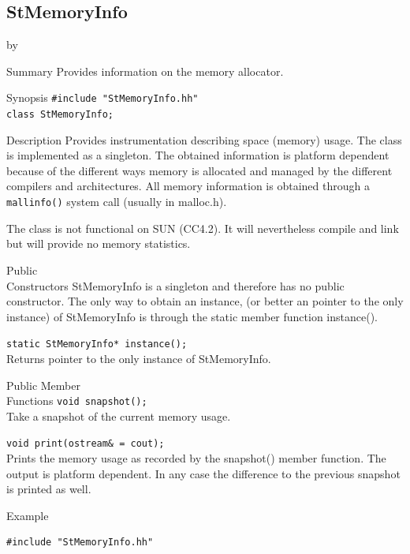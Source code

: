 \documentclass[twoside]{article}
\newcommand{\comp}[1]{\texttt{#1}}%
\newcommand{\entrylabel}[1]{\mbox{\textbf{{#1}}}\hfil}%
\newenvironment{entry}
{\begin{list}{}%
    {\renewcommand{\makelabel}{\entrylabel}%
     \setlength{\labelwidth}{90pt}%
     \setlength{\leftmargin}{\labelwidth}
     \advance\leftmargin by \labelsep%
      }%
    }%
  {\end{list}}
\newcommand{\Entrylabel}[1]%
{\raisebox{0pt}[1ex][0pt]{\makebox[\labelwidth][l]%
    {\parbox[t]{\labelwidth}{\hspace{0pt}\textbf{{#1}}}}}}
\newenvironment{Entry}%
{\renewcommand{\entrylabel}{\Entrylabel}\begin{entry}}%
  {\end{entry}}
\begin{document}
\subsection{StMemoryInfo}
\label{StMemoryInfo}
\begin{Entry}
\item[Summary]
    Provides information on the memory allocator.

\item[Synopsis]
    \verb+#include "StMemoryInfo.hh"+\\
    \verb+class StMemoryInfo;+
    
\item[Description]   
    Provides instrumentation describing space (memory) usage.
    The class is implemented as a singleton. The obtained information
    is platform dependent because of the different ways memory is
    allocated and managed by the different compilers and architectures.
    All memory information is obtained through a \comp{mallinfo()} system
    call (usually in malloc.h). 
    
    The class is not functional on SUN (CC4.2). It will nevertheless
    compile and link but will provide no memory statistics.
        
\item[Public\\ Constructors]
    StMemoryInfo is a singleton and therefore has no
    public constructor. The only way to obtain an instance,
    (or better an pointer to the only instance)
    of StMemoryInfo is through the static member function
    instance().

    \verb+static StMemoryInfo* instance();+\\
    Returns pointer to the only instance of StMemoryInfo.
    
\item[Public Member\\ Functions]
    \verb+void snapshot();+\\
    Take a snapshot of the current memory usage.
    
    \verb+void print(ostream& = cout);+\\
    Prints the memory usage as recorded by the snapshot()
    member function. The output is platform dependent. In any
    case the difference to the previous snapshot is printed
    as well.
    
\item[Example]
{\footnotesize
\begin{verbatim}
#include "StMemoryInfo.hh"


\end{verbatim}}
\end{Entry}
\end{document}
